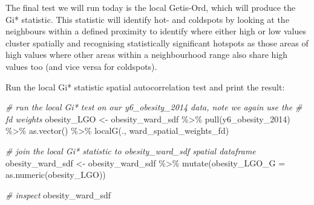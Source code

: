 \documentclass[
]{book}
\newenvironment{Shaded}{\begin{snugshade}}{\end{snugshade}}
\newcommand{\AttributeTok}[1]{\textcolor[rgb]{0.77,0.63,0.00}{#1}}
\newcommand{\CommentTok}[1]{\textcolor[rgb]{0.56,0.35,0.01}{\textit{#1}}}
\newcommand{\FunctionTok}[1]{\textcolor[rgb]{0.00,0.00,0.00}{#1}}
\newcommand{\NormalTok}[1]{#1}
\newcommand{\OtherTok}[1]{\textcolor[rgb]{0.56,0.35,0.01}{#1}}
\newcommand{\SpecialCharTok}[1]{\textcolor[rgb]{0.00,0.00,0.00}{#1}}
\begin{document}
The final test we will run today is the local Getis-Ord, which will produce the Gi* statistic. This statistic will identify hot- and coldspots by looking at the neighbours within a defined proximity to identify where either high or low values cluster spatially and recognising statistically significant hotspots as those areas of high values where other areas within a neighbourhood range also share high values too (and vice versa for coldspots).

Run the local Gi* statistic spatial autocorrelation test and print the result:

\begin{Shaded}
\begin{Highlighting}[]
\CommentTok{\# run the local Gi* test on our y6\_obesity\_2014 data, note we again use the}
\CommentTok{\# fd weights}
\NormalTok{obesity\_LGO }\OtherTok{\textless{}{-}}\NormalTok{ obesity\_ward\_sdf }\SpecialCharTok{\%\textgreater{}\%}
    \FunctionTok{pull}\NormalTok{(y6\_obesity\_2014) }\SpecialCharTok{\%\textgreater{}\%}
    \FunctionTok{as.vector}\NormalTok{() }\SpecialCharTok{\%\textgreater{}\%}
    \FunctionTok{localG}\NormalTok{(., ward\_spatial\_weights\_fd)}

\CommentTok{\# join the local Gi* statistic to \textasciigrave{}obesity\_ward\_sdf\textasciigrave{} spatial dataframe}
\NormalTok{obesity\_ward\_sdf }\OtherTok{\textless{}{-}}\NormalTok{ obesity\_ward\_sdf }\SpecialCharTok{\%\textgreater{}\%}
    \FunctionTok{mutate}\NormalTok{(}\AttributeTok{obesity\_LGO\_G =} \FunctionTok{as.numeric}\NormalTok{(obesity\_LGO))}

\CommentTok{\# inspect}
\NormalTok{obesity\_ward\_sdf}
\end{Highlighting}
\end{Shaded}
\end{document}
